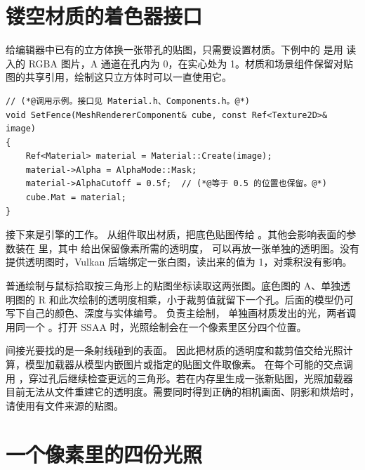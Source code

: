 \clearpage
\section{镂空材质的着色器接口}
给编辑器中已有的立方体换一张带孔的贴图，只需要设置材质。下例中的  是用  读入的 RGBA 图片，A 通道在孔内为 0，在实心处为 1。材质和场景组件保留对贴图的共享引用，绘制这只立方体时可以一直使用它。

\begin{lstlisting}
// (*@调用示例。接口见 Material.h、Components.h。@*)
void SetFence(MeshRendererComponent& cube, const Ref<Texture2D>& image)
{
    Ref<Material> material = Material::Create(image);
    material->Alpha = AlphaMode::Mask;
    material->AlphaCutoff = 0.5f;  // (*@等于 0.5 的位置也保留。@*)
    cube.Mat = material;
}
\end{lstlisting}

接下来是引擎的工作。 从组件取出材质，把底色贴图传给 。其他会影响表面的参数装在  里，其中  给出保留像素所需的透明度， 可以再放一张单独的透明图。没有提供透明图时，Vulkan 后端绑定一张白图，读出来的值为 1，对乘积没有影响。

普通绘制与鼠标拾取按三角形上的贴图坐标读取这两张图。底色图的 A、单独透明图的 R 和此次绘制的透明度相乘，小于裁剪值就留下一个孔。后面的模型仍可写下自己的颜色、深度与实体编号。 负责主绘制， 单独画材质发出的光，两者调用同一个 。打开 SSAA 时，光照绘制会在一个像素里区分四个位置。

间接光要找的是一条射线碰到的表面。 因此把材质的透明度和裁剪值交给光照计算，模型加载器从模型内嵌图片或指定的贴图文件取像素。 在每个可能的交点调用 ，穿过孔后继续检查更远的三角形。若在内存里生成一张新贴图，光照加载器目前无法从文件重建它的透明度。需要同时得到正确的相机画面、阴影和烘焙时，请使用有文件来源的贴图。


\clearpage
\section{一个像素里的四份光照}

